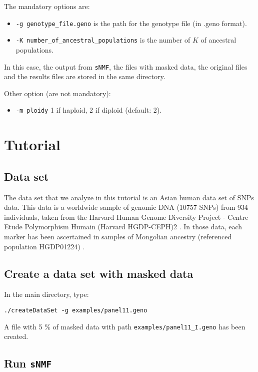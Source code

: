 \documentclass[10pt,a4paper]{article}
\begin{document}
\begin{itemize}
The mandatory options are:
\begin{itemize}
\item \verb|-g genotype_file.geno| is the path for the genotype file (in .geno format).
\item \verb|-K number_of_ancestral_populations| is the number of $K$ of ancestral populations.
\end{itemize}

In this case, the output from {\tt sNMF}, the files with masked data, the original files and the results files 
are stored in the same directory.

\noindent
Other option (are not mandatory):
\begin{itemize}
\item \verb|-m ploidy|  1 if haploid, 2 if diploid (default: 2). 
\end{itemize}

\end{itemize}

\section{Tutorial}

\subsection{Data set}
The data set that we analyze in this tutorial is an Asian human data set of SNPs data.
This data is a worldwide sample of genomic DNA (10757 SNPs) from 934 individuals,
taken from the Harvard Human Genome Diversity Project - Centre
Etude Polymorphism Humain (Harvard HGDP-CEPH)2 . 
In those data, each marker has been ascertained in samples of Mongolian
ancestry (referenced population HGDP01224) \cite{Patterson_2012}. 

\subsection{Create a data set with masked data}

In the main directory, type:
\begin{Verbatim}[frame=single]
./createDataSet -g examples/panel11.geno
\end{Verbatim}

\noindent
A file with 5 \% of masked data with path \verb|examples/panel11_I.geno| has been created.

\subsection{Run {\tt sNMF}}
\end{document}
